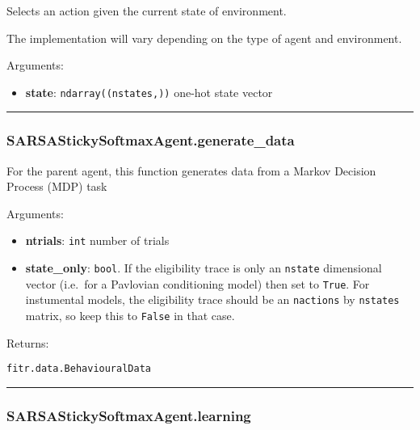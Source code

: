 Selects an action given the current state of environment.

The implementation will vary depending on the type of agent and
environment.

Arguments:

\begin{itemize}
\tightlist
\item
  \textbf{state}: \texttt{ndarray((nstates,))} one-hot state vector
\end{itemize}

\begin{center}\rule{0.5\linewidth}{\linethickness}\end{center}

\subsubsection{SARSAStickySoftmaxAgent.generate\_data}\label{sarsastickysoftmaxagent.generate_data}

\begin{Shaded}
\begin{Highlighting}[]
\OperatorTok{=}\NormalTok{)}
\end{Highlighting}
\end{Shaded}

For the parent agent, this function generates data from a Markov
Decision Process (MDP) task

Arguments:

\begin{itemize}
\tightlist
\item
  \textbf{ntrials}: \texttt{int} number of trials
\item
  \textbf{state\_only}: \texttt{bool}. If the eligibility trace is only
  an \texttt{nstate} dimensional vector (i.e.~for a Pavlovian
  conditioning model) then set to \texttt{True}. For instumental models,
  the eligibility trace should be an \texttt{nactions} by
  \texttt{nstates} matrix, so keep this to \texttt{False} in that case.
\end{itemize}

Returns:

\texttt{fitr.data.BehaviouralData}

\begin{center}\rule{0.5\linewidth}{\linethickness}\end{center}

\subsubsection{SARSAStickySoftmaxAgent.learning}\label{sarsastickysoftmaxagent.learning}

